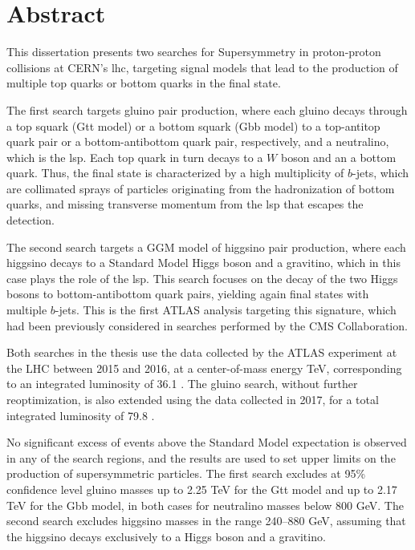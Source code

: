 \chapter*{Abstract}

This dissertation presents two searches for Supersymmetry in proton-proton collisions at CERN's \gls{lhc}, 
targeting signal models that lead to the production of multiple top quarks or bottom quarks in the final state.

The first search targets gluino pair production, where each gluino decays through a top squark (Gtt model) or a bottom squark (Gbb model) 
to a top-antitop quark pair or a bottom-antibottom quark pair, respectively, and a neutralino, which is the \gls{lsp}. 
Each top quark in turn decays to a $W$ boson and an a bottom quark.
Thus, the final state is characterized by a high multiplicity of $b$-jets, which are collimated sprays of particles originating from the hadronization of bottom quarks, and 
missing transverse momentum from the \gls{lsp} that escapes the detection. 

The second search targets a GGM model of higgsino pair production, 
where each higgsino decays to a Standard Model Higgs boson and 
a gravitino, which in this case plays the role of the \gls{lsp}. 
This search focuses on the decay of the two Higgs bosons to bottom-antibottom quark pairs, yielding again final states with multiple $b$-jets.
This is the first ATLAS analysis targeting this signature, which had been 
previously considered in searches performed by the CMS Collaboration.

Both searches in the thesis use the data collected by the ATLAS experiment at the LHC 
between 2015 and 2016, at a center-of-mass energy  \cmtre TeV,
corresponding to an integrated luminosity of 36.1 \ifb.
The gluino search, without further reoptimization, is also extended using the data collected in 2017, for a total integrated luminosity of 79.8 \ifb.

No significant excess of events above the Standard Model expectation is observed in any of the search regions, 
and the results are used to set upper limits on the production of supersymmetric particles. 
The first search excludes at 95\% confidence level gluino masses up to 2.25 TeV for the Gtt model 
and up to 2.17 TeV for the Gbb model, in both cases for neutralino masses below 800 GeV.
The second search excludes higgsino masses in the range 240--880 GeV, assuming 
that the higgsino decays exclusively to a Higgs boson and a gravitino. 

\par\bigskip
\par\bigskip 
\par\bigskip

